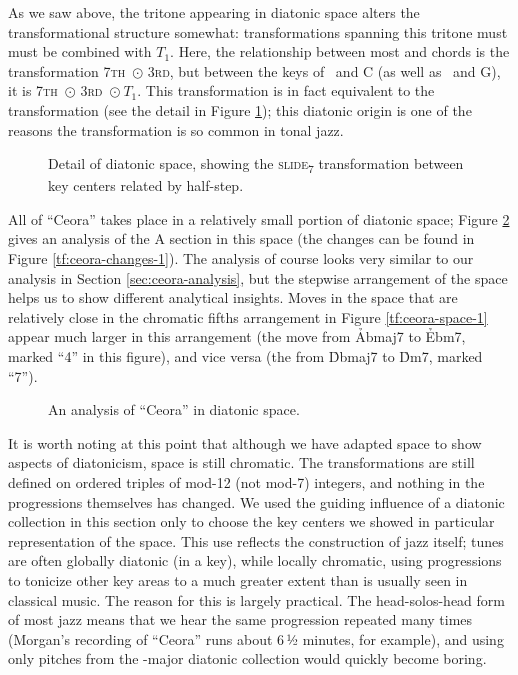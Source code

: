 As we saw above, the tritone appearing in diatonic space alters the
transformational structure somewhat: transformations spanning this tritone
must must be combined with $T_1$. Here, the relationship between most
\I and \ii chords is the transformation \textsc{7th}~$\odot$
\textsc{3rd}, but between the keys of \Dflat\ and C (as well as \Aflat\ and
G), it is \textsc{7th}~$\odot$ \textsc{3rd}~$\odot\ T_1$. This transformation
is in fact equivalent to the transformation \slideS (see the detail in Figure
\ref{tfe:diatonic-space-detail}); this diatonic origin is one of the reasons
the \slideS transformation is so common in tonal jazz.

\begin{figure}[tbp]
  \caption{Detail of diatonic \tf space, showing the \textsc{slide}\textsubscript{7}
    transformation between key centers related by half-step.}
  \label{tfe:diatonic-space-detail}
\end{figure}

All of ``Ceora'' takes place in a relatively small portion of diatonic \tf
space; Figure \ref{tfe:ceora-space-diatonic} gives an analysis of the A
section in this space (the changes can be found in Figure
\ref{tf:ceora-changes-1}). The analysis of course looks very similar
to our analysis in Section \ref{sec:ceora-analysis}, but the stepwise
arrangement of the space helps us to show different analytical insights. Moves in
the space that are relatively close in the chromatic fifths arrangement in
Figure \ref{tf:ceora-space-1} appear much larger in this arrangement (the move
from \h{Abmaj7} to \h{Ebm7}, marked ``4'' in this figure), and vice versa (the
\slideS from \h{Dbmaj7} to \h{Dm7}, marked ``7'').

\begin{figure}[tbp]
  \caption{An analysis of ``Ceora'' in diatonic \tf space.}
  \label{tfe:ceora-space-diatonic}
\end{figure}

It is worth noting at this point that although we have adapted \tf space to
show aspects of diatonicism, \tf space is still chromatic. The transformations
are still defined on ordered triples of mod-12 (not mod-7) integers, and
nothing in the \tfo progressions themselves has changed. We used the guiding
influence of a diatonic collection in this section only to choose the key
centers we showed in particular representation of the space. This use reflects
the construction of jazz itself; tunes are often globally diatonic (in a key),
while locally chromatic, using \tfo progressions to tonicize other key areas
to a much greater extent than is usually seen in classical music. The reason
for this is largely practical. The head-solos-head form of most jazz means
that we hear the same progression repeated many times (Morgan's recording of
``Ceora'' runs about 6\,½ minutes, for example), and using only pitches from the
\Aflat-major diatonic collection would quickly become boring.

